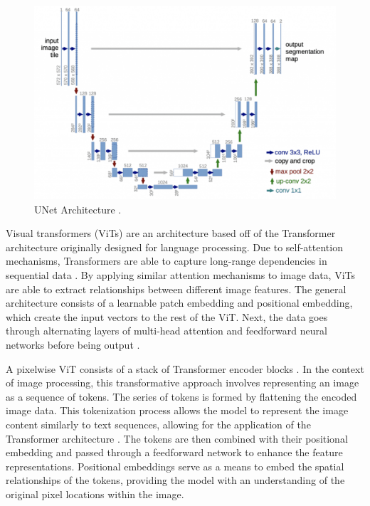 \documentclass[10pt,twocolumn]{article}
\begin{document}
\begin{figure}[h]
	\centering
        \includegraphics[scale=0.25]{unet}
	\caption{UNet Architecture \cite{unet}.}
	\label{fig:unet}
\end{figure}

Visual transformers (ViTs) are an architecture based off of the Transformer architecture originally designed for language processing. Due to self-attention mechanisms, Transformers are able to capture long-range dependencies in sequential data \cite{transformer}. By applying similar attention mechanisms to image data, ViTs are able to extract relationships between different image features. The general architecture consists of a learnable patch embedding and positional embedding, which create the input vectors to the rest of the ViT. Next, the data goes through alternating layers of multi-head attention and feedforward neural networks before being output \cite{vit}. 

A pixelwise ViT consists of a stack of Transformer encoder blocks \cite{bert}. In the context of image processing, this transformative approach involves representing an image as a sequence of tokens. The series of tokens is formed by flattening the encoded image data. This tokenization process allows the model to represent the image content similarly to text sequences, allowing for the application of the Transformer architecture \cite{bert}. The tokens are then combined with their positional embedding and passed through a feedforward network to enhance the feature representations. Positional embeddings serve as a means to embed the spatial relationships of the tokens, providing the model with an understanding of the original pixel locations within the image.
\end{document}
